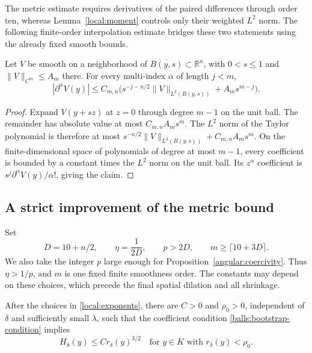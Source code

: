 The metric estimate requires derivatives of the paired differences
through order ten, whereas Lemma~\ref{local:moment} controls only their
weighted $L^2$ norm.  The following finite-order interpolation estimate
bridges these two statements using the already fixed smooth bounds.

\begin{lemma}\label{local:interpolation}
Let $V$ be smooth on a neighborhood of $\overline{B(y,s)}\subset
\mathbb R^n$, with $0<s\leq1$ and $\|V\|_{C^m}\leq A_m$ there.
For every multi-index $\alpha$ of length $j<m$,
\begin{equation}\label{local:interpolation-estimate}
 |\partial^\alpha V(y)|\leq C_{m,n}
 \bigl(s^{-j-n/2}\|V\|_{L^2(B(y,s))}
                          +A_m s^{m-j}\bigr).
\end{equation}
\end{lemma}

\begin{proof}
Expand $V(y+sz)$ at $z=0$ through degree $m-1$ on the unit ball.
The remainder has absolute value at most $C_{m,n}A_m s^m$.
The $L^2$ norm of the Taylor polynomial is therefore at most
$s^{-n/2}\|V\|_{L^2(B(y,s))}+C_{m,n}A_m s^m$.
On the finite-dimensional space of polynomials of degree at most
$m-1$, every coefficient is bounded by a constant times the $L^2$
norm on the unit ball.  Its $z^\alpha$ coefficient is
$s^j\partial^\alpha V(y)/\alpha!$, giving the claim.
\end{proof}

\subsection{A strict improvement of the metric bound}

Set
\begin{equation}\label{local:exponents}
 D=10+n/2,\qquad \eta=\frac1{2D},\qquad
 p>2D,\qquad m\geq\lceil10+3D\rceil.
\end{equation}
We also take the integer $p$ large enough for
Proposition~\ref{angular:coercivity}.  Thus $\eta>1/p$, and $m$ is
one fixed finite smoothness order.  The constants may depend on these
choices, which precede the final spatial dilation and all shrinkage.

\begin{lemma}\label{local:improvement}
After the choices in \eqref{local:exponents}, there are $C>0$ and
$\rho_0>0$, independent of $\delta$ and sufficiently small $\lambda$,
such that the coefficient condition
\eqref{balls:bootstrap-condition} implies
\begin{equation}\label{local:superlinear}
 H_8(y)\leq C r_\delta(y)^{3/2}
 \quad\text{for }y\in K\text{ with }r_\delta(y)<\rho_0.
\end{equation}
\end{lemma}

